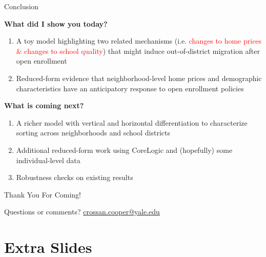 \documentclass[notes,11pt, aspectratio=169]{beamer}
\newenvironment{wideitemize}{\itemize\addtolength{\itemsep}{10pt}}{\enditemize}
\begin{document}
\begin{frame}{Conclusion}
\begin{wideitemize}
    \item \textbf{What did I show you today?}
    \begin{enumerate}
    \item A toy model highlighting two related mechanisms (i.e. \textcolor{red}{changes to home prices \& changes to school quality}) that might induce out-of-district migration after open enrollment
    \item Reduced-form evidence that neighborhood-level home prices and demographic characteristics have an anticipatory response to open enrollment policies
    \end{enumerate}
    \item \textbf{What is coming next?}
    \begin{enumerate}
    \item A richer model with vertical and horizontal differentiation to characterize sorting across neighborhoods and school districts
    \item Additional reduced-form work using CoreLogic and (hopefully) some individual-level data
    \item Robustness checks on existing results
    \end{enumerate}
\end{wideitemize}
\end{frame}


\begin{frame}
  \centering \Huge
  Thank You For Coming!

  \bigskip 
  \centering \small
  Questions or comments? \url{crossan.cooper@yale.edu}
\end{frame}

\section*{Extra Slides}

\appendix
\end{document}
